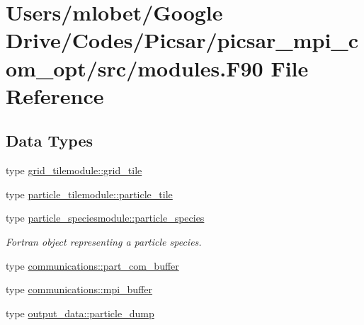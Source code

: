 \hypertarget{modules_8_f90}{}\section{Users/mlobet/\+Google Drive/\+Codes/\+Picsar/picsar\+\_\+mpi\+\_\+com\+\_\+opt/src/modules.F90 File Reference}
\label{modules_8_f90}
\subsection*{Data Types}
\begin{DoxyCompactItemize}
\item 
type \hyperlink{structgrid__tilemodule_1_1grid__tile}{grid\+\_\+tilemodule\+::grid\+\_\+tile}
\item 
type \hyperlink{structparticle__tilemodule_1_1particle__tile}{particle\+\_\+tilemodule\+::particle\+\_\+tile}
\item 
type \hyperlink{structparticle__speciesmodule_1_1particle__species}{particle\+\_\+speciesmodule\+::particle\+\_\+species}
\begin{DoxyCompactList}\small\item\em Fortran object representing a particle species. \end{DoxyCompactList}\item 
type \hyperlink{structcommunications_1_1part__com__buffer}{communications\+::part\+\_\+com\+\_\+buffer}
\item 
type \hyperlink{structcommunications_1_1mpi__buffer}{communications\+::mpi\+\_\+buffer}
\item 
type \hyperlink{structoutput__data_1_1particle__dump}{output\+\_\+data\+::particle\+\_\+dump}
\end{DoxyCompactItemize}
